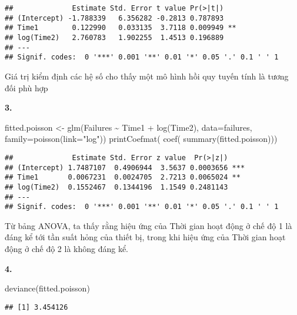 \documentclass[
]{article}
\newenvironment{Shaded}{\begin{snugshade}}{\end{snugshade}}
\newcommand{\AttributeTok}[1]{\textcolor[rgb]{0.77,0.63,0.00}{#1}}
\newcommand{\FunctionTok}[1]{\textcolor[rgb]{0.00,0.00,0.00}{#1}}
\newcommand{\NormalTok}[1]{#1}
\newcommand{\OtherTok}[1]{\textcolor[rgb]{0.56,0.35,0.01}{#1}}
\newcommand{\SpecialCharTok}[1]{\textcolor[rgb]{0.00,0.00,0.00}{#1}}
\newcommand{\StringTok}[1]{\textcolor[rgb]{0.31,0.60,0.02}{#1}}
\begin{document}
\begin{verbatim}
##              Estimate Std. Error t value Pr(>|t|)   
## (Intercept) -1.788339   6.356282 -0.2813 0.787893   
## Time1        0.122990   0.033135  3.7118 0.009949 **
## log(Time2)   2.760783   1.902255  1.4513 0.196889   
## ---
## Signif. codes:  0 '***' 0.001 '**' 0.01 '*' 0.05 '.' 0.1 ' ' 1
\end{verbatim}

Giá trị kiểm định các hệ số cho thấy một mô hình hồi quy tuyến tính là
tương đối phù hợp

\textbf{3.}

\begin{Shaded}
\begin{Highlighting}[]
\NormalTok{fitted.poisson }\OtherTok{\textless{}{-}} \FunctionTok{glm}\NormalTok{(Failures }\SpecialCharTok{\textasciitilde{}}\NormalTok{ Time1 }\SpecialCharTok{+} \FunctionTok{log}\NormalTok{(Time2), }\AttributeTok{data=}\NormalTok{failures, }\AttributeTok{family=}\FunctionTok{poisson}\NormalTok{(}\AttributeTok{link=}\StringTok{"log"}\NormalTok{))}
\FunctionTok{printCoefmat}\NormalTok{( }\FunctionTok{coef}\NormalTok{( }\FunctionTok{summary}\NormalTok{(fitted.poisson)))}
\end{Highlighting}
\end{Shaded}

\begin{verbatim}
##              Estimate Std. Error z value  Pr(>|z|)    
## (Intercept) 1.7487107  0.4906944  3.5637 0.0003656 ***
## Time1       0.0067231  0.0024705  2.7213 0.0065024 ** 
## log(Time2)  0.1552467  0.1344196  1.1549 0.2481143    
## ---
## Signif. codes:  0 '***' 0.001 '**' 0.01 '*' 0.05 '.' 0.1 ' ' 1
\end{verbatim}

Từ bảng ANOVA, ta thấy rằng hiệu ứng của Thời gian hoạt động ở chế độ 1
là đáng kể tới tần suất hỏng của thiết bị, trong khi hiệu ứng của Thời
gian hoạt động ở chế độ 2 là không đáng kể.

\textbf{4.}

\begin{Shaded}
\begin{Highlighting}[]
\FunctionTok{deviance}\NormalTok{(fitted.poisson)}
\end{Highlighting}
\end{Shaded}

\begin{verbatim}
## [1] 3.454126
\end{verbatim}
\end{document}
